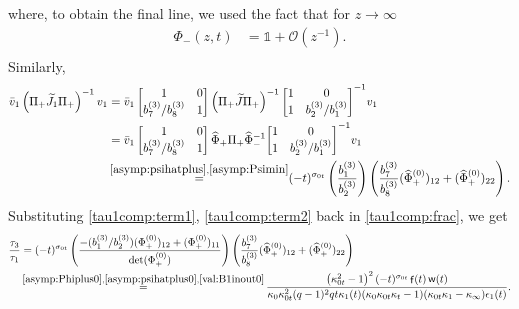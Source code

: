 \documentclass[a4paper,reqno,11pt]{amsart}
\numberwithin{equation}{section}
\numberwithin{figure}{section}
\theoremstyle{plain}
\theoremstyle{remark}
\DeclareMathOperator{\sff}{{\sf f}}
\DeclareMathOperator{\sfw}{{\sf w}}
\numberwithin{rhp}{section}
\begin{document}
where, to obtain the final line, we used the fact that for $z\to \infty$
\begin{align}
    \Phi_{-}(z,t)&=  \mathbb{1}  + \mathcal{O}(z^{-1}). \label{asymp:Phimin} \\
\end{align}
Similarly,
\begin{align}
    \bar{v}_1 \left(\Pi_{+} \widetilde{J}_1 \Pi_{+} \right)^{-1} v_1 &=  \bar{v}_1\begin{bmatrix}
       1  & 0 \\
        b_7^{(3)}/b_8^{(3)} & 1
    \end{bmatrix}  \left(\Pi_{+} \widetilde{J}  \Pi_{+} \right)^{-1} { \begin{bmatrix}
       1 & 0 \\
        1 & b_2^{(3)}/b_1^{(3)}
    \end{bmatrix}}^{-1} v_1 \\
    &=  \bar{v}_1\begin{bmatrix}
       1  & 0 \\
        b_7^{(3)}/b_8^{(3)} & 1
    \end{bmatrix}  \widehat{\Phi}_{+} \Pi_{+} \widehat{\Phi}_{-}^{-1} { \begin{bmatrix}
       1 & 0 \\
        1 & b_2^{(3)}/b_1^{(3)}
    \end{bmatrix}}^{-1} v_1 \\
    & \mathop{=}^{\eqref{asymp:psihatplus},\eqref{asymp:Psimin}}(-t)^{\sigma_{0t}} \left(\frac{b_1^{(3)}}{b_2^{(3)}} \right) \left(\frac{b_7^{(3)}}{b_8^{(3)}} (\widehat{\Phi}_{+}^{(0)})_{12} + (\widehat{\Phi}_{+}^{(0)})_{22}\right).\label{tau1comp:term2}
\end{align}
Substituting \eqref{tau1comp:term1}, \eqref{tau1comp:term2} back in \eqref{tau1comp:frac}, we get 
\begin{align}
    \frac{\tau_3}{\tau_1} &= (-t)^{\sigma_{0t}} \left(\frac{{ - (b_1^{(3)}/b_2^{(3)})(\Phi_{+}^{(0)})_{12} +  (\Phi_{+}^{(0)})_{11}}}{\det (\Phi_{+}^{(0)})} \right) \left( \frac{b_7^{(3)}}{b_8^{(3)}} (\widehat{\Phi}_{+}^{(0)})_{12} + (\widehat{\Phi}_{+}^{(0)})_{22}\right)\label{tau18:exp1}\\
&\mathop{=}^{\eqref{asymp:Phiplus0},\eqref{asymp:psihatplus0},\eqref{val:B1inout0}} \frac{\left(\kappa_{0t}^2-1\right)^2  (-t)^{\sigma_{0t}} \sff(t)\sfw(t)}{\kappa_{0} \kappa_{0t}^2 (q-1)^2 q t \kappa_{1}(t) (\kappa_{0} \kappa_{0t} \kappa_{t}-1) (\kappa_{0t} \kappa_{1}-\kappa_{\infty})\epsilon_1(t)}.\label{tau18:final}
\end{align}
\end{document}
